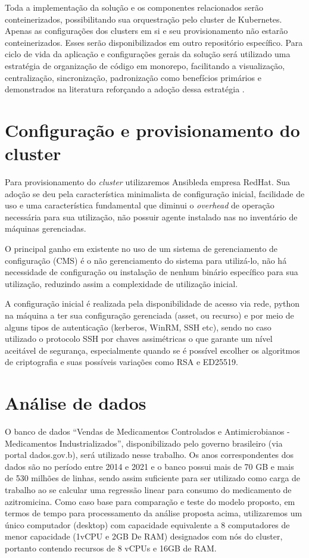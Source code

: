 Toda a implementação da solução e os componentes relacionados serão conteinerizados, possibilitando  sua orquestração pelo cluster de Kubernetes\textregistered. Apenas as configurações dos clusters em si e seu provisionamento não estarão conteinerizados. Esses serão disponibilizados em outro repositório específico. 
Para ciclo de vida da aplicação e configurações gerais da solução será utilizado uma estratégia de organização de código em monorepo, facilitando a visualização, centralização, sincronização, padronização como benefícios primários e demonstrados na literatura reforçando a adoção dessa estratégia \cite{brito_monorepos_2018}.


\section{Configuração e provisionamento do cluster}
Para provisionamento do \emph{cluster} utilizaremos Ansible\textregistered da empresa RedHat\textregistered. Sua adoção se deu pela característica minimalista de configuração inicial, facilidade de uso e uma característica fundamental que diminui o \emph{overhead} de operação necessária para sua utilização, não possuir agente instalado nas no inventário de máquinas gerenciadas. 

O principal ganho em existente no uso de um sistema de gerenciamento de configuração (CMS) é o não gerenciamento do sistema para utilizá-lo, não há necessidade de configuração ou instalação de nenhum binário específico para sua utilização, reduzindo assim a complexidade de utilização inicial.

A configuração inicial é realizada pela disponibilidade de acesso via rede, python na máquina a ter sua configuração gerenciada (asset, ou recurso) e por meio de alguns tipos de autenticação (kerberos, WinRM, SSH etc), sendo no caso utilizado o protocolo SSH \cite{noauthor_rfc4254_nodate} por chaves assimétricas o que garante um nível aceitável de segurança, especialmente quando se é possível escolher os algoritmos de criptografia e suas possíveis variações como RSA e ED25519.

\section{Análise de dados}

O banco de dados “Vendas de Medicamentos Controlados e Antimicrobianos - Medicamentos Industrializados”, disponibilizado pelo governo brasileiro (via portal dados.gov.b), será utilizado nesse trabalho. Os anos correspondentes dos dados são no período entre 2014 e 2021 e o banco possui mais de 70 GB  e mais de 530 milhões de linhas, sendo assim suficiente para ser utilizado como carga de trabalho ao se calcular uma regressão linear para consumo do medicamento de azitromicina.
Como caso base para comparação e teste do modelo proposto, em termos de tempo para processamento da análise proposta acima,  utilizaremos um único computador (desktop) com capacidade equivalente a 8 computadores de menor capacidade (1vCPU e 2GB De RAM) designados com nós do cluster, portanto contendo recursos de  8 vCPUs e 16GB de RAM. 

